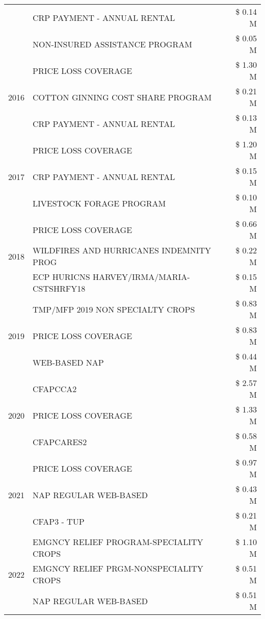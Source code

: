 \begin{tabular}{llr}
 & CRP PAYMENT - ANNUAL RENTAL & \$ 0.14 M \\
 & NON-INSURED ASSISTANCE PROGRAM & \$ 0.05 M \\
\cline{1-3}
\multirow[t]{3}{*}{2016} & PRICE LOSS COVERAGE & \$ 1.30 M \\
 & COTTON GINNING COST SHARE PROGRAM & \$ 0.21 M \\
 & CRP PAYMENT - ANNUAL RENTAL & \$ 0.13 M \\
\cline{1-3}
\multirow[t]{3}{*}{2017} & PRICE LOSS COVERAGE & \$ 1.20 M \\
 & CRP PAYMENT - ANNUAL RENTAL & \$ 0.15 M \\
 & LIVESTOCK FORAGE PROGRAM & \$ 0.10 M \\
\cline{1-3}
\multirow[t]{3}{*}{2018} & PRICE LOSS COVERAGE & \$ 0.66 M \\
 & WILDFIRES AND HURRICANES INDEMNITY PROG & \$ 0.22 M \\
 & ECP HURICNS HARVEY/IRMA/MARIA-CSTSHRFY18 & \$ 0.15 M \\
\cline{1-3}
\multirow[t]{3}{*}{2019} & TMP/MFP 2019 NON SPECIALTY CROPS & \$ 0.83 M \\
 & PRICE LOSS COVERAGE & \$ 0.83 M \\
 & WEB-BASED NAP & \$ 0.44 M \\
\cline{1-3}
\multirow[t]{3}{*}{2020} & CFAPCCA2 & \$ 2.57 M \\
 & PRICE LOSS COVERAGE & \$ 1.33 M \\
 & CFAPCARES2 & \$ 0.58 M \\
\cline{1-3}
\multirow[t]{3}{*}{2021} & PRICE LOSS COVERAGE & \$ 0.97 M \\
 & NAP REGULAR WEB-BASED & \$ 0.43 M \\
 & CFAP3 - TUP & \$ 0.21 M \\
\cline{1-3}
\multirow[t]{3}{*}{2022} & EMGNCY RELIEF PROGRAM-SPECIALITY CROPS & \$ 1.10 M \\
 & EMGNCY RELIEF PRGM-NONSPECIALITY CROPS & \$ 0.51 M \\
 & NAP REGULAR WEB-BASED & \$ 0.51 M \\
\cline{1-3}
\bottomrule
\end{tabular}
